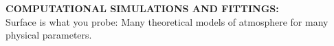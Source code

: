 \documentclass[10pt]{beamer}
\begin{document}
\begin{frame}
\begin{columns}[c]
\begin{column}{0.55\textwidth}
\begin{center}
{  \quad
  
  {\bf  COMPUTATIONAL SIMULATIONS AND FITTINGS:}\\
  Surface is what you probe: Many theoretical models of atmosphere for many physical parameters.
  }
  \end{center}
\end{column}
\end{columns}

\end{frame}




\end{document}
